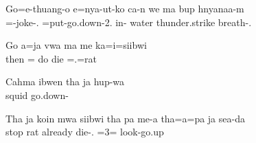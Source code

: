 \gll Go=e-thuang-o e=nya-ut-ko ca-n we ma bup hnyanaa-m\\ =-joke-. =put-go.down-2. in- water  thunder.strike breath-.\\ \glt {}

\z
\ea%

\gll Go a=ja vwa ma me ka=i=siibwi\\ 
then = do  die =.=rat\\ 
\glt {}

\z
\ea%

\gll Cahma ibwen tha ja hup-wa\\  squid   go.down-\\ \glt {}

\z
\ea%

\gll Tha ja koin mwa siibwi tha pa me-a tha=a=pa ja sea-da\\   stop  rat  already die-. =3=  look-go.up\\ \glt {}

\z


